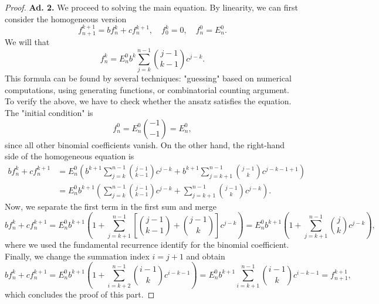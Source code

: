 \documentclass[12pt,a4paper]{article}
\begin{document}
\begin{proof}
	\medskip\noindent\textbf{Ad. 2.} We proceed to solving the main equation. By linearity, we can first consider the homogeneous version
	\begin{equation}
		f^{k+1}_{n+1} = b f^k_n + c f^{k+1}_{n}, \quad f^k_0 = 0, \quad f^0_n = E^0_n.
	\end{equation}
	We will that
	\begin{equation}
		f^k_n = E^0_n b^k \sum_{j=k}^{n-1} \binom{j-1}{k-1} c^{j-k}.
	\end{equation}
	This formula can be found by several techniques: "guessing" based on numerical computations, using generating functions, or combinatorial counting argument. To verify the above, we have to check whether the ansatz satisfies the equation. The "initial condition" is 
	\begin{equation}
		f^0_n = E^0_n \binom{-1}{-1} = E^0_n,
	\end{equation}
	since all other binomial coefficients vanish. On the other hand, the right-hand side of the homogeneous equation is
	\begin{equation}
		\begin{split}
			b f^k_n + c f^{k+1}_{n} 
			&= E^0_n \left( b^{k+1} \sum_{j=k}^{n-1} \binom{j-1}{k-1} c^{j-k} + b^{k+1} \sum_{j=k+1}^{n-1} \binom{j-1}{k} c^{j-k-1+1}\right) \\
			&= E^0_n b^{k+1} \left( \sum_{j=k}^{n-1} \binom{j-1}{k-1} c^{j-k} + \sum_{j=k+1}^{n-1} \binom{j-1}{k} c^{j-k}\right).
		\end{split}
	\end{equation} 
	Now, we separate the first term in the first sum and merge
	\begin{equation}
		b f^k_n + c f^{k+1}_{n} = E^0_n b^{k+1} \left(1+ \sum_{j=k+1}^{n-1} \left[\binom{j-1}{k-1} + \binom{j-1}{k}\right]c^{j-k}\right) = E^0_n b^{k+1} \left(1+ \sum_{j=k+1}^{n-1}\binom{j}{k} c^{j-k}\right),
	\end{equation} 
	where we used the fundamental recurrence identify for the binomial coefficient. Finally, we change the summation index $i = j+1$ and obtain
	\begin{equation}
		b f^k_n + c f^{k+1}_{n} = E^0_n b^{k+1} \left(1+ \sum_{i=k+2}^{n-1}\binom{i-1}{k} c^{i-k-1}\right) = E^0_n b^{k+1} \sum_{i=k+1}^{n-1}\binom{i-1}{k} c^{i-k-1} = f^{k+1}_{n+1},
	\end{equation} 
	which concludes the proof of this part. 
	

\end{proof}
\end{document}

